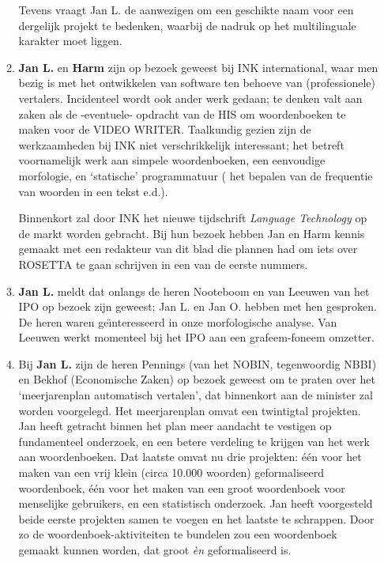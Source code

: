 \begin{itemize}
\begin{enumerate}
Tevens vraagt Jan L. de aanwezigen om een geschikte naam voor een dergelijk
projekt te bedenken, waarbij de nadruk op het multilinguale 
karakter moet liggen.
  \item {\bf Jan L.} en {\bf Harm} zijn op bezoek geweest bij INK international,
waar men bezig is met het ontwikkelen van software ten behoeve van
(professionele) vertalers. Incidenteel wordt ook ander werk gedaan; te denken 
valt aan zaken als de -eventuele- opdracht van de HIS om woordenboeken te 
maken voor de VIDEO WRITER. Taalkundig gezien zijn de werkzaamheden bij INK 
niet verschrikkelijk interessant; het betreft voornamelijk werk 
aan simpele woordenboeken, een eenvoudige morfologie, en `statische' 
programmatuur ( het bepalen van de frequentie van woorden in een tekst e.d.).

Binnenkort zal door INK het nieuwe tijdschrift {\em Language Technology} op de 
markt worden gebracht. Bij hun bezoek hebben Jan en Harm kennis gemaakt met 
een redakteur van 
dit blad die plannen had om iets over ROSETTA te gaan schrijven in een van de
eerste nummers.
 
  \item {\bf Jan L.} meldt dat onlangs de heren Nooteboom en van Leeuwen 
van het IPO op bezoek zijn geweest; Jan L. en Jan O. hebben met hen gesproken. 
De heren waren ge\"{\i}nteresseerd in onze morfologische analyse. Van Leeuwen
werkt momenteel bij het IPO aan een grafeem-foneem omzetter.

  \item Bij {\bf Jan L.} zijn de heren Pennings (van het NOBIN, 
tegenwoordig NBBI) en Bekhof (Economische Zaken) op bezoek geweest om te praten
over het `meerjarenplan automatisch vertalen', dat binnenkort aan de 
minister zal worden voorgelegd. Het meerjarenplan omvat een twintigtal
projekten. Jan 
heeft getracht binnen het plan meer aandacht te vestigen op fundamenteel 
onderzoek, en een betere verdeling te krijgen van het werk aan woordenboeken. 
Dat laatste omvat nu drie projekten: \'{e}\'{e}n voor het maken van een vrij 
klein (circa 10.000 woorden) geformaliseerd woordenboek, \'{e}\'{e}n voor het 
maken van een groot woordenboek voor
menselijke gebruikers, en een statistisch onderzoek. Jan heeft voorgesteld beide
eerste projekten samen te voegen en het laatste te schrappen. Door zo de 
woordenboek-aktiviteiten te bundelen zou een woordenboek gemaakt kunnen worden,
dat groot {\em \`{e}n} geformaliseerd is.

\end{enumerate}


\end{itemize}
